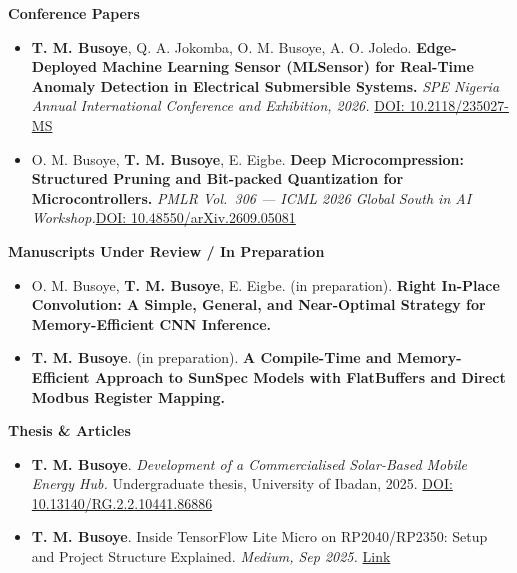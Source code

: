 \documentclass[10pt, a4paper]{article}
\begin{document}
\vspace{4pt}
\noindent\textbf{Conference Papers}

\begin{itemize}[leftmargin=1em]
  \item \textbf{T. M. Busoye}, Q. A. Jokomba, O. M. Busoye, A. O. Joledo.
        \textbf{Edge-Deployed Machine Learning Sensor (MLSensor) for Real-Time Anomaly Detection
          in Electrical Submersible Systems.}
        \textit{SPE Nigeria Annual International Conference and Exhibition, 2026.}
        \href{https://doi.org/10.2118/235027-MS}{DOI: 10.2118/235027-MS}


  \item O. M. Busoye, \textbf{T. M. Busoye}, E. Eigbe.
        \textbf{Deep Microcompression: Structured Pruning and Bit-packed Quantization
          for Microcontrollers.}
        \textit{PMLR Vol.\ 306 --- ICML 2026 Global South in AI Workshop.}\href{https://doi.org/10.48550/arXiv.2609.05081}{DOI: 10.48550/arXiv.2609.05081}
\end{itemize}

\vspace{4pt}
\noindent\textbf{Manuscripts Under Review / In Preparation}

\begin{itemize}[leftmargin=1em]
  \item O. M. Busoye, \textbf{T. M. Busoye}, E. Eigbe. (in preparation).
        \textbf{Right In-Place Convolution: A Simple, General, and Near-Optimal Strategy
          for Memory-Efficient CNN Inference.}

  \item \textbf{T. M. Busoye}. (in preparation).
        \textbf{A Compile-Time and Memory-Efficient Approach to SunSpec Models
          with FlatBuffers and Direct Modbus Register Mapping.}
\end{itemize}

\vspace{4pt}
\noindent\textbf{Thesis \& Articles}

\begin{itemize}[leftmargin=1em]
  \item \textbf{T. M. Busoye}.
        \textit{Development of a Commercialised Solar-Based Mobile Energy Hub.}
        Undergraduate thesis, University of Ibadan, 2025.
        \href{https://doi.org/10.13140/RG.2.2.10441.86886}{DOI: 10.13140/RG.2.2.10441.86886}

  \item \textbf{T. M. Busoye}. Inside TensorFlow Lite Micro on RP2040/RP2350:
        Setup and Project Structure Explained. \textit{Medium, Sep 2025.}
        \href{https://medium.com/@switches0011/inside-tensorflow-lite-micro-on-rp2040-rp2350-setup-and-project-structure-explained-3f15a970a3f2}{Link}
\end{itemize}
\end{document}
